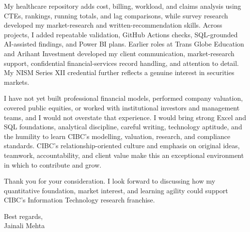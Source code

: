 \documentclass[letterpaper,11pt]{article}
\begin{document}
\bigbreak
My healthcare repository adds cost, billing, workload, and claims analysis using CTEs, rankings, running totals, and lag comparisons, while survey research developed my market-research and written-recommendation skills. Across projects, I added repeatable validation, GitHub Actions checks, SQL-grounded AI-assisted findings, and Power BI plans. Earlier roles at Trans Globe Education and Arihant Investment developed my client communication, market-research support, confidential financial-services record handling, and attention to detail. My NISM Series XII credential further reflects a genuine interest in securities markets.

\bigbreak
I have not yet built professional financial models, performed company valuation, covered public equities, or worked with institutional investors and management teams, and I would not overstate that experience. I would bring strong Excel and SQL foundations, analytical discipline, careful writing, technology aptitude, and the humility to learn CIBC's modelling, valuation, research, and compliance standards. CIBC's relationship-oriented culture and emphasis on original ideas, teamwork, accountability, and client value make this an exceptional environment in which to contribute and grow.

\bigbreak
Thank you for your consideration. I look forward to discussing how my quantitative foundation, market interest, and learning agility could support CIBC's Information Technology research franchise.

\bigbreak
Best regards,\\
Jainali Mehta
\end{document}

